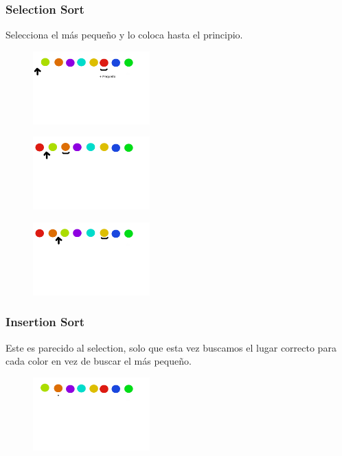 \documentclass[12pt, fleqn]{report}                             %
\theoremstyle{break}                                            %
\begin{document}
        \subsubsection{Selection Sort}
        Selecciona el más pequeño y lo coloca hasta el principio.
        \begin{figure}[h]
                        \centering
                        \includegraphics[width=0.4\textwidth]{graphics/Selection-1.png}
                    \end{figure}
        \begin{figure}[h]
                        \centering
                        \includegraphics[width=0.4\textwidth]{graphics/Selection-2.png}
                    \end{figure}
    	\begin{figure}[h]
                        \centering
                        \includegraphics[width=0.4\textwidth]{graphics/Selection-3.png}
                    \end{figure}

 \clearpage
                    
        \subsubsection{Insertion Sort}
        Este es parecido al selection, solo que esta vez buscamos el lugar correcto para cada color en vez de buscar el más pequeño.
        \begin{figure}[h]
                        \centering
                        \includegraphics[width=0.4\textwidth]{graphics/Insertion-1.png}
                    \end{figure}
    
\end{document}
